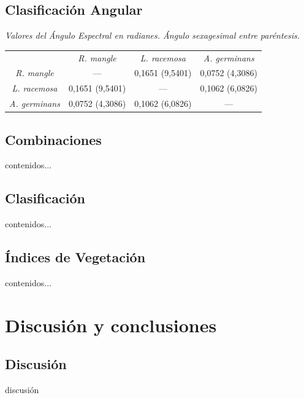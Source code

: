 \documentclass[12pt]{beamer}
\begin{document}
\subsection{Clasificación Angular}
\begin{frame}
	\begin{table}
		\centering
\textit{{\footnotesize Valores del Ángulo Espectral en radianes. Ángulo sexagesimal entre paréntesis.}}
		{\small \begin{tabular}{@{}cccc@{}}
			\toprule[0.4mm]
			& \textit{R. mangle} & \textit{L. racemosa} & \textit{A. germinans} \\
			\textit{R. mangle} & --- & 0,1651 (9,5401) & 0,0752 (4,3086) \\
			\textit{L. racemosa} & 0,1651 (9,5401) & --- & 0,1062 (6,0826) \\
			\textit{A. germinans} & 0,0752 (4,3086) & 0,1062 (6,0826) & --- \\
			\bottomrule[0.4mm]
		\end{tabular}}
	\end{table}
\end{frame}

\subsection{Combinaciones}
\begin{frame}
	contenidos...
\end{frame}

\subsection{Clasificación}
\begin{frame}
	contenidos...
\end{frame}

\subsection{Índices de Vegetación}
\begin{frame}
	contenidos...
\end{frame}

\section{Discusión y conclusiones}
\subsection{Discusión}
\begin{frame}
	discusión
\end{frame}
\end{document}
